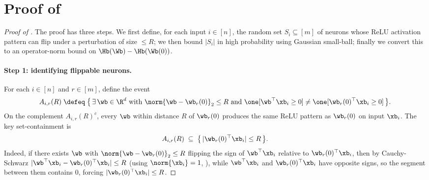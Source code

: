 \section{Proof of \texorpdfstring{}{Lemma 2}}\label{sec:proof_perturbation}

\begin{proof}[Proof of ]
The proof has three steps. We first define, for each input $i \in [n]$, the random set $S_i \subseteq [m]$ of neurons whose ReLU activation pattern can flip under a perturbation of size $\le R$; we then bound $|S_i|$ in high probability using Gaussian small-ball; finally we convert this to an operator-norm bound on $\Hb(\Wb) - \Hb(\Wb(0))$.

\paragraph{Step 1: identifying flippable neurons.}
For each $i \in [n]$ and $r \in [m]$, define the event
\begin{align}\label{eq:flip_event}
A_{i, r}(R) \;\defeq\; \big\{ \, \exists \, \wb \in \R^d \text{ with } \norm{\wb - \wb_r(0)}_2 \le R \text{ and } \one[\wb^\top \xb_i \ge 0] \ne \one[\wb_r(0)^\top \xb_i \ge 0] \, \big\}.
\end{align}
On the complement $A_{i,r}(R)^c$, every $\wb$ within distance $R$ of $\wb_r(0)$ produces the same ReLU pattern as $\wb_r(0)$ on input $\xb_i$. The key set-containment is
\begin{align}\label{eq:flip_containment}
A_{i, r}(R) \;\subseteq\; \big\{ \, |\wb_r(0)^\top \xb_i| \le R \, \big\}.
\end{align}
Indeed, if there exists $\wb$ with $\norm{\wb - \wb_r(0)}_2 \le R$ flipping the sign of $\wb^\top \xb_i$ relative to $\wb_r(0)^\top \xb_i$, then by Cauchy-Schwarz $|\wb^\top \xb_i - \wb_r(0)^\top \xb_i| \le R$ (using $\norm{\xb_i}=1$, ), while $\wb^\top \xb_i$ and $\wb_r(0)^\top \xb_i$ have opposite signs, so the segment between them contains $0$, forcing $|\wb_r(0)^\top \xb_i| \le R$.


\end{proof}
